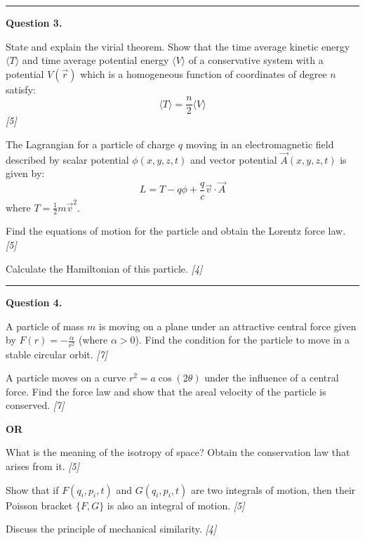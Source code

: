 \documentclass[11pt,a4paper]{article}
\newcommand{\pts}[1]{\hfill   \textit{[#1]}}
\begin{document}
\medskip\rule{\linewidth}{0.2pt}




\noindent   \textbf{Question 3.}

\begin{parts}
  \item State and explain the virial theorem. Show that the time average kinetic energy $\langle T \rangle$ and time average potential energy $\langle V \rangle$ of a conservative system with a potential $V(\vec{r})$ which is a homogeneous function of coordinates of degree $n$ satisfy:
    \[ \langle T \rangle = \frac{n}{2} \langle V \rangle \] \pts{5}
  \item The Lagrangian for a particle of charge $q$ moving in an electromagnetic field described by scalar potential $\phi(x,y,z,t)$ and vector potential $\vec{A}(x,y,z,t)$ is given by:
    \[ L = T - q\phi + \frac{q}{c} \vec{v} \cdot \vec{A} \]
    where $T = \frac{1}{2} m \vec{v}^2$.
    
\begin{parts}
      \item Find the equations of motion for the particle and obtain the Lorentz force law. \pts{5}
      \item Calculate the Hamiltonian of this particle. \pts{4}
    \end{parts}
\end{parts}

\medskip\rule{\linewidth}{0.2pt}




\noindent   \textbf{Question 4.}

\begin{parts}
  \item A particle of mass $m$ is moving on a plane under an attractive central force given by $F(r) = -\frac{\alpha}{r^2}$ (where $\alpha > 0$). Find the condition for the particle to move in a stable circular orbit. \pts{7}
  \item A particle moves on a curve $r^2 = a \cos(2 \theta)$ under the influence of a central force. Find the force law and show that the areal velocity of the particle is conserved. \pts{7}
\end{parts}
\hfill   \textbf{OR}

\begin{parts}
  \item What is the meaning of the isotropy of space? Obtain the conservation law that arises from it. \pts{5}
  \item Show that if $F(q_i, p_i, t)$ and $G(q_i, p_i, t)$ are two integrals of motion, then their Poisson bracket $\{F, G\}$ is also an integral of motion. \pts{5}
  \item Discuss the principle of mechanical similarity. \pts{4}
\end{parts}
\end{document}
